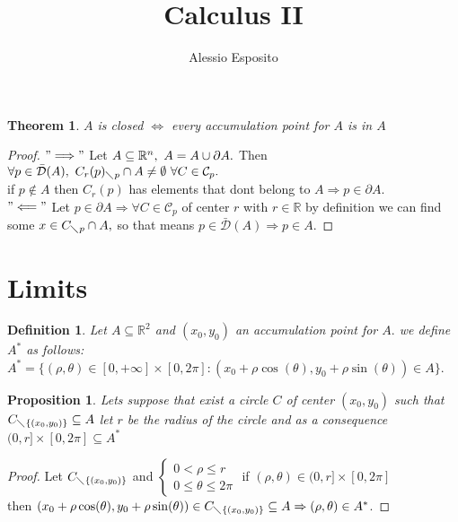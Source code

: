 \documentclass{article}
\title{Calculus II}
\author{Alessio Esposito}
\newtheorem{theorem}{Theorem}
\newtheorem{definition}{Definition}
\newtheorem{proposition}{Proposition}
\begin{document}
\maketitle

    \begin{theorem}
        $A$ is closed $\Longleftrightarrow$ every accumulation point for $A$ is in $A$ \hfill    
    \end{theorem}
    \begin{proof}
        $"\Longrightarrow"$ Let $A \subseteq \mathbb{R}^n, \ A = A \cup \partial A. \\$ Then $\forall  p \in \bar{\mathcal{D}} (A), \ C_r(p)_{\diagdown p}\cap A \neq \emptyset \ \forall  C \in \mathcal{C}_p.$ \\
        if $ p \notin A $ then $C_r(p)$ has elements that dont belong to $A \Rightarrow p \in \partial A.$ \\
        $"\Longleftarrow"$ Let $p \in \partial A \Rightarrow \forall C \in \mathcal{C}_p$ of center $r$ with $r \in \mathbb{R}$ by definition we can find some $x \in C_{\diagdown p} \cap A, $ so that means $p \in \bar{\mathcal{D}} (A) \Rightarrow p \in A.$       
    \end{proof}

\section{Limits}

    \begin{definition}
        Let $A \subseteq \mathbb{R}^2$ and $(x_0,y_0)$ an accumulation point for $A.$ we define $A^*$ as follows: \\ 
        $A^* = \{(\rho , \theta) \in [0, +\infty ] \times [0, 2\pi] : (x_0 + \rho \cos(\theta), y_0 + \rho \sin(\theta)) \in A \}.$

    \end{definition}
        
    \begin{proposition}
        Lets suppose that exist a circle $C$ of center $(x_0,y_0)$ such that $C_{\diagdown \{ (x_0,y_0) \}} \subseteq A$ let $r$ be the radius of the circle and as a consequence $(0,r] \times [0,2\pi] \subseteq A^*$
    \end{proposition}
    
    \begin{proof}
        Let $C_{\diagdown \{ (x_0,y_0) \}}$ and
            $\begin{cases}
                0 < \rho \leqslant r \\
                0 \leqslant \theta \leqslant 2\pi
            \end{cases}$
            if $(\rho, \theta) \in (0,r] \times [0,2\pi]$ \\ then $(x_0 + \rho \cos(\theta), y_0 + \rho \sin(\theta)) \in C_{\diagdown \{ (x_0,y_0) \}} \subseteq A \Rightarrow (\rho, \theta) \in A^*$.
    \end{proof}
        
\end{document}

